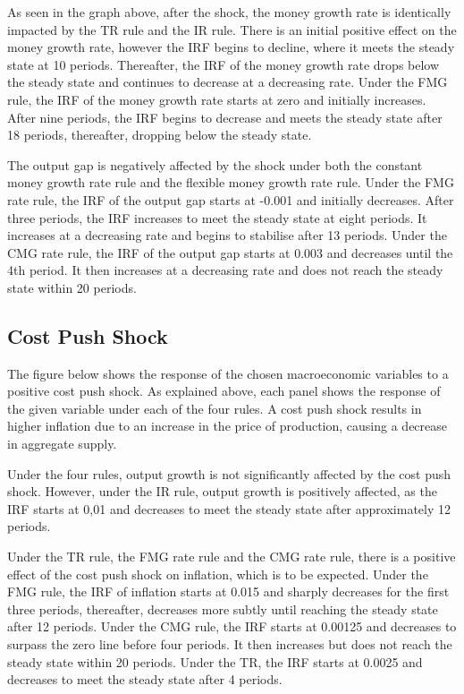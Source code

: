 \documentclass[11pt,preprint, authoryear]{elsarticle}
\numberwithin{equation}{section}
\numberwithin{figure}{section}
\numberwithin{table}{section}
\begin{document}
As seen in the graph above, after the shock, the money growth rate is
identically impacted by the TR rule and the IR rule. There is an initial
positive effect on the money growth rate, however the IRF begins to
decline, where it meets the steady state at 10 periods. Thereafter, the
IRF of the money growth rate drops below the steady state and continues
to decrease at a decreasing rate. Under the FMG rule, the IRF of the
money growth rate starts at zero and initially increases. After nine
periods, the IRF begins to decrease and meets the steady state after 18
periods, thereafter, dropping below the steady state.

The output gap is negatively affected by the shock under both the
constant money growth rate rule and the flexible money growth rate rule.
Under the FMG rate rule, the IRF of the output gap starts at -0.001 and
initially decreases. After three periods, the IRF increases to meet the
steady state at eight periods. It increases at a decreasing rate and
begins to stabilise after 13 periods. Under the CMG rate rule, the IRF
of the output gap starts at 0.003 and decreases until the 4th period. It
then increases at a decreasing rate and does not reach the steady state
within 20 periods.

\hypertarget{cost-push-shock}{%
\subsection{Cost Push Shock}\label{cost-push-shock}}

The figure below shows the response of the chosen macroeconomic
variables to a positive cost push shock. As explained above, each panel
shows the response of the given variable under each of the four rules. A
cost push shock results in higher inflation due to an increase in the
price of production, causing a decrease in aggregate supply.

Under the four rules, output growth is not significantly affected by the
cost push shock. However, under the IR rule, output growth is positively
affected, as the IRF starts at 0,01 and decreases to meet the steady
state after approximately 12 periods.

Under the TR rule, the FMG rate rule and the CMG rate rule, there is a
positive effect of the cost push shock on inflation, which is to be
expected. Under the FMG rule, the IRF of inflation starts at 0.015 and
sharply decreases for the first three periods, thereafter, decreases
more subtly until reaching the steady state after 12 periods. Under the
CMG rule, the IRF starts at 0.00125 and decreases to surpass the zero
line before four periods. It then increases but does not reach the
steady state within 20 periods. Under the TR, the IRF starts at 0.0025
and decreases to meet the steady state after 4 periods.
\end{document}
